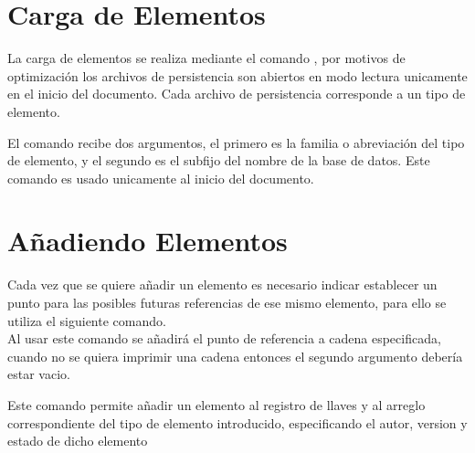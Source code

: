 \section{Carga de Elementos}

La carga de elementos se realiza mediante el comando {\bf{}}, por motivos de optimización los archivos de persistencia son abiertos en modo lectura unicamente en el inicio del documento. Cada archivo de persistencia corresponde a un tipo de elemento.
    
    \begin{code}
    \end{code}
    
\noindent El comando recibe dos argumentos, el primero es la familia o abreviación del tipo de elemento, y el segundo es el subfijo del nombre de la base de datos. Este comando es usado unicamente al inicio del documento.
    
    \begin{code}
    \end{code}


\section{Añadiendo Elementos}

Cada vez que se quiere añadir un elemento es necesario indicar establecer un punto para las posibles futuras referencias de ese mismo elemento, para ello se utiliza el siguiente comando.\\

{\bf{}} Al usar este comando se añadirá el punto de referencia a cadena especificada, cuando no se quiera imprimir una cadena entonces el segundo argumento debería estar vacio.

    \begin{code}
    \end{code}
    
{\bf{}} Este comando permite añadir un elemento al registro de llaves y al arreglo correspondiente del tipo de elemento introducido, especificando el autor, version y estado de dicho elemento

    \begin{code}
    \end{code}

